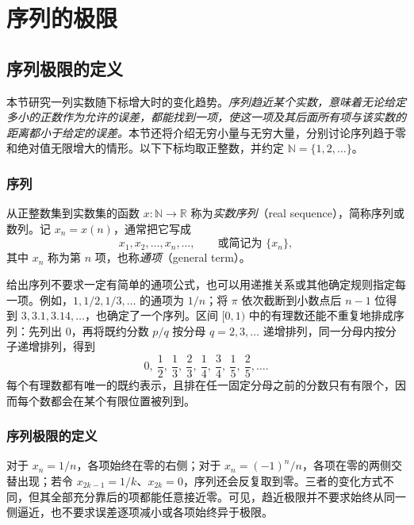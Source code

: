 \setcounter{chapter}{1} %
\chapter{序列的极限}
\label{chap:sequence-limits}

\section{序列极限的定义}
\label{sec:definition-of-sequence-limits}

本节研究一列实数随下标增大时的变化趋势。\emph{序列趋近某个实数，意味着无论给定多小的正数作为允许的误差，都能找到一项，使这一项及其后面所有项与该实数的距离都小于给定的误差。}本节还将介绍无穷小量与无穷大量，分别讨论序列趋于零和绝对值无限增大的情形。以下下标均取正整数，并约定 $\mathbb{N}=\{1,2,\ldots\}$。

\subsection{序列}
\label{subsec:sequences}

\begin{definition}
\label{def:real-sequence}
从正整数集到实数集的函数 $x:\mathbb{N}\to\mathbb{R}$ 称为\emph{实数序列}（real sequence），简称序列或数列。记 $x_n=x(n)$，通常把它写成
\[
    x_1,x_2,\ldots,x_n,\ldots,
    \qquad\text{或简记为 }\{x_n\},
\]
其中 $x_n$ 称为第 $n$ 项，也称\emph{通项}（general term）。
\end{definition}

给出序列不要求一定有简单的通项公式，也可以用递推关系或其他确定规则指定每一项。例如，$1,1/2,1/3,\ldots$ 的通项为 $1/n$；将 $\pi$ 依次截断到小数点后 $n-1$ 位得到 $3,3.1,3.14,\ldots$，也确定了一个序列。区间 $[0,1)$ 中的有理数还能不重复地排成序列：先列出 $0$，再将既约分数 $p/q$ 按分母 $q=2,3,\ldots$ 递增排列，同一分母内按分子递增排列，得到
\[
    0,\ \frac12,\ \frac13,\ \frac23,\ \frac14,\ \frac34,\ \frac15,\ \frac25,\ldots.
\]
每个有理数都有唯一的既约表示，且排在任一固定分母之前的分数只有有限个，因而每个数都会在某个有限位置被列到。

\subsection{序列极限的定义}
\label{subsec:definition-of-sequence-limits}

对于 $x_n=1/n$，各项始终在零的右侧；对于 $x_n=(-1)^n/n$，各项在零的两侧交替出现；若令 $x_{2k-1}=1/k$、$x_{2k}=0$，序列还会反复取到零。三者的变化方式不同，但其全部充分靠后的项都能任意接近零。可见，趋近极限并不要求始终从同一侧逼近，也不要求误差逐项减小或各项始终异于极限。

